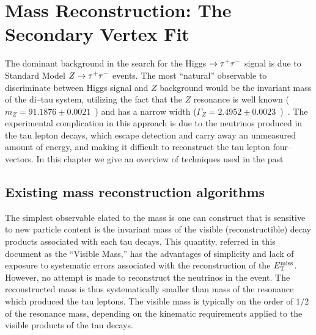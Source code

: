 \ifx\master\undefined\fi

\newcommand{\mtau}{m_{\tau}}
\newcommand{\mnus}{m_{\nu\nu}}
\newcommand{\mvis}{m_{vis}}

\chapter{Mass Reconstruction: The Secondary Vertex Fit}
\label{ch:svfit}

The dominant background in the search for the Higgs $\to \tau^+\tau^-$ signal is due to
Standard Model $Z\to\tau^+\tau^-$ events.  The most ``natural'' observable to discriminate
between Higgs signal and $Z$ background would be the invariant mass of the
di--tau system, utilizing the fact that the $Z$ resonance is well known ($m_{Z}
= 91.1876 \pm 0.0021$~\GeVcc) and has a narrow width ($\Gamma_{Z} = 2.4952 \pm
0.0023$~\GeV)~\cite{PDG}.  The experimental complication in this approach is due
to the neutrinos produced in the tau lepton decays, which escape detection and
carry away an unmeasured amount of energy, and making it difficult to
reconstruct the tau lepton four--vectors.  In this chapter we give an overview
of techniques used in the past 

\section{Existing mass reconstruction algorithms}

The simplest observable elated to the \TT mass is one can construct that is
sensitive to new particle content is the invariant mass of the visible
(reconstructible) decay products associated with each tau decays.  This
quantity, referred in this document as the ``Visible Mass,'' has the advantages
of simplicity and lack of exposure to systematic errors associated with the
reconstruction of the $E_{\mathrm{T}}^{\text{miss}}$.  However, no attempt is made to reconstruct the
neutrinos in the event.  The reconstructed mass is thus systematically smaller
than mass of the resonance which produced the tau leptons.  The visible mass is
typically on the order of $1/2$ of the resonance mass, depending on the
kinematic requirements applied to the visible products of the tau decays. 


